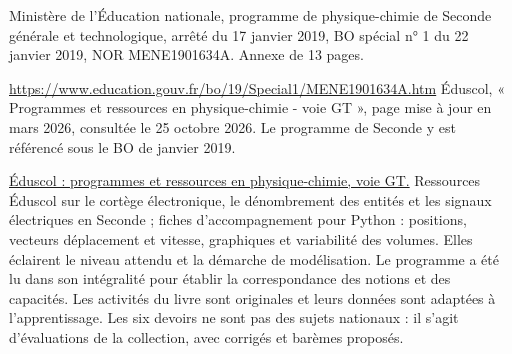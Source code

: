 Ministère de l'Éducation nationale, programme de physique-chimie de Seconde générale et technologique, arrêté du 17 janvier 2019, BO spécial n° 1 du 22 janvier 2019, NOR MENE1901634A. Annexe de 13 pages.\par\smallskip
\url{https://www.education.gouv.fr/bo/19/Special1/MENE1901634A.htm}
Éduscol, « Programmes et ressources en physique-chimie - voie GT », page mise à jour en mars 2026, consultée le 25 octobre 2026. Le programme de Seconde y est référencé sous le BO de janvier 2019.\par\smallskip
\href{https://eduscol.education.gouv.fr/5829/programmes-et-ressources-en-physique-chimie-voie-gt}{Éduscol : programmes et ressources en physique-chimie, voie GT.}
Ressources Éduscol sur le cortège électronique, le dénombrement des entités et les signaux électriques en Seconde ; fiches d'accompagnement pour Python : positions, vecteurs déplacement et vitesse, graphiques et variabilité des volumes. Elles éclairent le niveau attendu et la démarche de modélisation.
Le programme a été lu dans son intégralité pour établir la correspondance des notions et des capacités. Les activités du livre sont originales et leurs données sont adaptées à l'apprentissage. Les six devoirs ne sont pas des sujets nationaux : il s'agit d'évaluations de la collection, avec corrigés et barèmes proposés.

